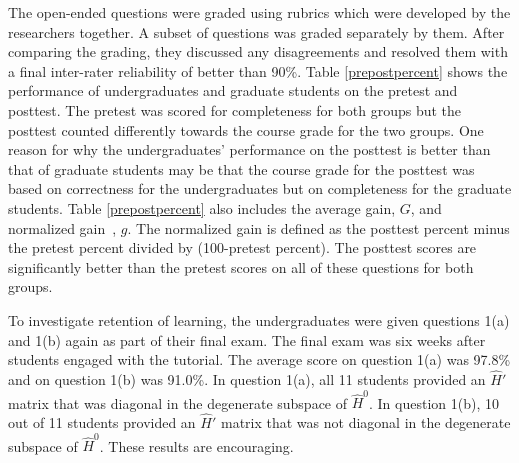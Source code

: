 \documentclass[aps,pra,showpacs,showkeys,twocolumn,groupedaddress]{revtex4-1}
\begin{document}
The open-ended questions were graded using rubrics which were developed by the researchers together. A subset of questions was graded separately by them. After comparing 
the grading, they discussed any disagreements and resolved them 
with a final inter-rater reliability of better than 90\%. Table \ref{prepostpercent} shows the performance of undergraduates and graduate students on the pretest and posttest.  The pretest was scored for completeness for both groups but the posttest counted differently towards the course grade for the two groups.  One reason for why the undergraduates' performance on the posttest is better than that of graduate students may be that the course grade for the posttest was based on correctness for the undergraduates but on completeness for the graduate students. Table \ref{prepostpercent} also includes the average gain, $G$, and normalized gain~\cite{hake}, $g$.  The normalized gain is defined as the posttest percent minus the pretest percent divided by (100-pretest percent). The posttest scores are significantly better than the pretest scores on all of these questions for both groups.

To investigate retention of learning, the undergraduates were given questions 1(a) and 1(b) again as part of their final exam.  The final exam was six weeks after students engaged with the tutorial.   
The average score on question 1(a) was 97.8\% and on question 1(b) was 91.0\%.  In question 1(a), all 11 students provided an $\hat{H}'$ matrix that was diagonal in the degenerate subspace of $\hat{H}^0$.
In question 1(b), 10 out of 11 students provided an $\hat{H}'$ matrix that was not diagonal in the degenerate subspace of $\hat{H}^0$.
These results 
are encouraging.
\end{document}
